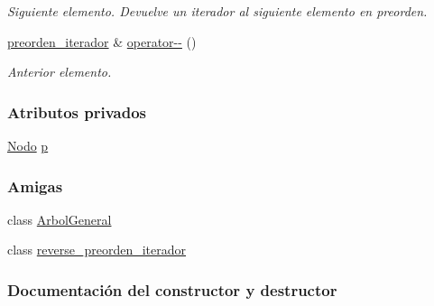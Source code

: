 \begin{DoxyCompactItemize}
\begin{DoxyCompactList}\small\item\em Siguiente elemento.  Devuelve un iterador al siguiente elemento en preorden. \end{DoxyCompactList}\item 
\hyperlink{classArbolGeneral_1_1preorden__iterador}{preorden\+\_\+iterador} \& \hyperlink{classArbolGeneral_1_1preorden__iterador_a79952609e35dd16830356a19b404abba}{operator-\/-\/} ()
\begin{DoxyCompactList}\small\item\em Anterior elemento. \end{DoxyCompactList}\end{DoxyCompactItemize}
\subsubsection*{Atributos privados}
\begin{DoxyCompactItemize}
\item 
\hyperlink{classArbolGeneral_a12cc1b74a9095d89bc7334290d332f7a}{Nodo} \hyperlink{classArbolGeneral_1_1preorden__iterador_afac01ba5fdc1e10c2a808d92f1dbddaf}{p}
\end{DoxyCompactItemize}
\subsubsection*{Amigas}
\begin{DoxyCompactItemize}
\item 
class \hyperlink{classArbolGeneral_1_1preorden__iterador_a9c06e31b7c3e0d4ee5b03003d32935a5}{Arbol\+General}
\item 
class \hyperlink{classArbolGeneral_1_1preorden__iterador_ad7df6535fb84021c7c3804850af9fdcd}{reverse\+\_\+preorden\+\_\+iterador}
\end{DoxyCompactItemize}


\subsubsection{Documentación del constructor y destructor}
\hypertarget{classArbolGeneral_1_1preorden__iterador_a1ad7d0b716beb169de08516187b002e4}{}\label{classArbolGeneral_1_1preorden__iterador_a1ad7d0b716beb169de08516187b002e4} 
